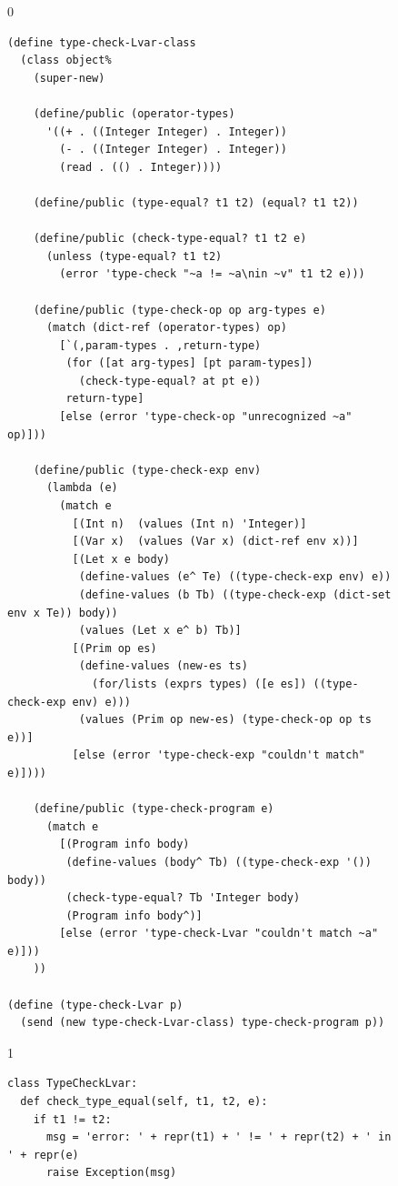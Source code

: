 \documentclass[7x10]{TimesAPriori_MIT}%
\def\racketEd{0}
\def\pythonEd{1}
\def\edition{1}
\newcommand{\pythonColor}[0]{}
\numberwithin{theorem}{chapter}
\numberwithin{definition}{chapter}
\numberwithin{equation}{chapter}
\begin{document}
\begin{figure}[tbp]
\begin{tcolorbox}[colback=white]
{\if\edition\racketEd  
\begin{lstlisting}[basicstyle=\ttfamily\footnotesize]
(define type-check-Lvar-class
  (class object%
    (super-new)

    (define/public (operator-types)
      '((+ . ((Integer Integer) . Integer))
        (- . ((Integer Integer) . Integer))
        (read . (() . Integer))))

    (define/public (type-equal? t1 t2) (equal? t1 t2))

    (define/public (check-type-equal? t1 t2 e)
      (unless (type-equal? t1 t2)
        (error 'type-check "~a != ~a\nin ~v" t1 t2 e)))

    (define/public (type-check-op op arg-types e)
      (match (dict-ref (operator-types) op)
        [`(,param-types . ,return-type)
         (for ([at arg-types] [pt param-types])
           (check-type-equal? at pt e))
         return-type]
        [else (error 'type-check-op "unrecognized ~a" op)]))

    (define/public (type-check-exp env)
      (lambda (e)
        (match e
          [(Int n)  (values (Int n) 'Integer)]
          [(Var x)  (values (Var x) (dict-ref env x))]
          [(Let x e body)
           (define-values (e^ Te) ((type-check-exp env) e))
           (define-values (b Tb) ((type-check-exp (dict-set env x Te)) body))
           (values (Let x e^ b) Tb)]
          [(Prim op es)
           (define-values (new-es ts)
             (for/lists (exprs types) ([e es]) ((type-check-exp env) e)))
           (values (Prim op new-es) (type-check-op op ts e))]
          [else (error 'type-check-exp "couldn't match" e)])))

    (define/public (type-check-program e)
      (match e
        [(Program info body)
         (define-values (body^ Tb) ((type-check-exp '()) body))
         (check-type-equal? Tb 'Integer body)
         (Program info body^)]
        [else (error 'type-check-Lvar "couldn't match ~a" e)]))
    ))

(define (type-check-Lvar p)
  (send (new type-check-Lvar-class) type-check-program p))
\end{lstlisting}
\fi}
{\if\edition\pythonEd\pythonColor
\begin{lstlisting}[escapechar=`]
class TypeCheckLvar:
  def check_type_equal(self, t1, t2, e):
    if t1 != t2:
      msg = 'error: ' + repr(t1) + ' != ' + repr(t2) + ' in ' + repr(e)
      raise Exception(msg)
          

\end{lstlisting}}
\end{tcolorbox}
\end{figure}
\end{document}
